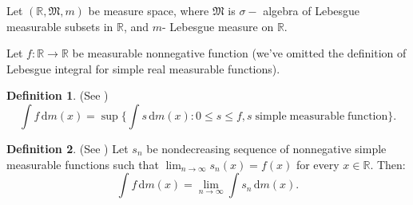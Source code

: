 \documentclass[11pt]{article}
\theoremstyle{definition}
\newtheorem{defin}{Definition}
\theoremstyle{definition}
\newcommand{\ds}{\displaystyle}
\newcommand{\R}{\mathbb{R}}
\newcommand{\dx}{\,\mathrm{d}}
\begin{document}
Let $(\R, \mathfrak{M}, m)$ be measure space, where
$\mathfrak{M}$ is $\sigma-$ algebra of Lebesgue measurable subsets
in $\R$, and $m$- Lebesgue measure on  $\R$.

Let $f:\R \to \R$ be measurable nonnegative function (we've  omitted the definition of Lebesgue integral for simple real measurable functions).

\begin{defin} (See \cite{Rudin, Bartle, Jones, Browder, Folland})
\label{def:1}
\begin{equation}
\label{eq:1}
\int f\dx m(x) = \sup \Big\{ \int s\dx m(x): 0\leq s \leq f, s\; \mathrm{simple\;measurable\; function}\Big\}.
\end{equation}
\end{defin}

\begin{defin} (See \cite{Char, Kol, Sik})
\label{def:2}
Let $s_n$ be nondecreasing sequence of nonnegative simple measurable functions such that $\ds \lim_{n\to \infty}s_n (x)=f(x)$ for every $x\in \R$.
Then:
\begin{equation}
\label{eq:2}
\int f\dx m(x) = \lim_{n\to \infty}\int s_n \dx m(x).
\end{equation}
\end{defin}
\end{document}
